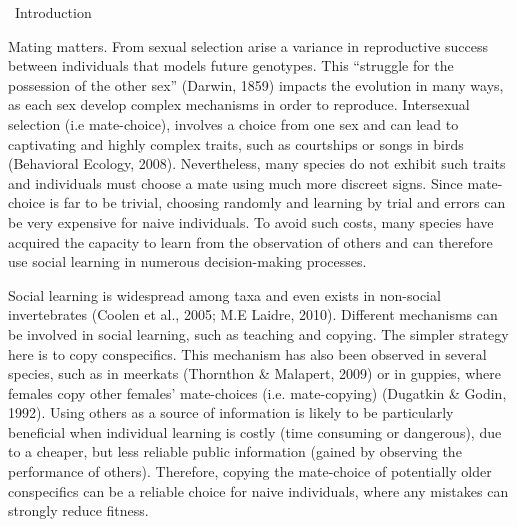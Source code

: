 \documentclass{article}
\title{}
\author{dell}
\date{2019-05-15}
\begin{document}
\ Introduction


\bigskip


\bigskip

Mating matters. From sexual selection arise a variance in reproductive success between individuals that models future genotypes. This “struggle for the possession of the other sex” (Darwin, 1859) impacts the evolution in many ways, as each sex develop complex mechanisms in order to reproduce. Intersexual selection (i.e mate-choice), involves a choice from one sex and can lead to captivating and highly complex traits, such as courtships or songs in birds (Behavioral Ecology, 2008). Nevertheless, many species do not exhibit such traits and individuals must choose a mate using much more discreet signs. Since mate-choice is far to be trivial, choosing randomly and learning by trial and errors can be very expensive for naive individuals. To avoid such costs, many species have acquired the capacity to learn from the observation of others and can therefore use social learning in numerous decision-making processes.


\bigskip

Social learning is widespread among taxa and even exists in non-social invertebrates (Coolen et al., 2005; M.E Laidre, 2010). Different mechanisms can be involved in social learning, such as teaching and copying. The simpler strategy here is to copy conspecifics. This mechanism has also been observed in several species, such as in meerkats (Thornthon \& Malapert, 2009) or in guppies, where females copy other females’ mate-choices (i.e. mate-copying) (Dugatkin \& Godin, 1992). Using others as a source of information is likely to be particularly beneficial when individual learning is costly (time consuming or dangerous), due to a cheaper, but less reliable public information (gained by observing the performance of others). Therefore, copying the mate-choice of potentially older conspecifics can be a reliable choice for naive individuals, where any mistakes can strongly reduce fitness.


\bigskip
\end{document}
